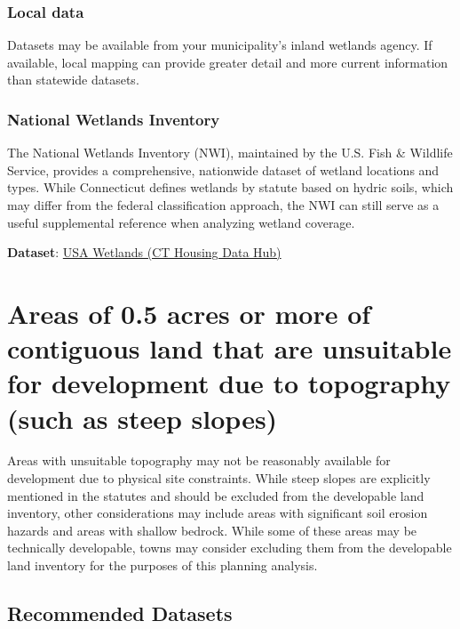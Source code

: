 \documentclass[
  letterpaper,
  DIV=11,
  numbers=noendperiod]{scrreprt}
\begin{document}
\subsubsection{Local data}\label{sec-local-data3}

Datasets may be available from your municipality's inland wetlands
agency. If available, local mapping can provide greater detail and more
current information than statewide datasets.

\subsubsection{National Wetlands Inventory}\label{sec-nwi}

The National Wetlands Inventory (NWI), maintained by the U.S. Fish \&
Wildlife Service, provides a comprehensive, nationwide dataset of
wetland locations and types. While Connecticut defines wetlands by
statute based on hydric soils, which may differ from the federal
classification approach, the NWI can still serve as a useful
supplemental reference when analyzing wetland coverage.

\textbf{Dataset}:
\href{https://housingmaps.ct.gov/maps/9afd2367671f43eaa4cf3972edd32350/about}{USA
Wetlands (CT Housing Data Hub)}

\section{Areas of 0.5 acres or more of contiguous land that are
unsuitable for development due to topography (such as steep
slopes)}\label{areas-of-0.5-acres-or-more-of-contiguous-land-that-are-unsuitable-for-development-due-to-topography-such-as-steep-slopes}

Areas with unsuitable topography may not be reasonably available for
development due to physical site constraints. While steep slopes are
explicitly mentioned in the statutes and should be excluded from the
developable land inventory, other considerations may include areas with
significant soil erosion hazards and areas with shallow bedrock. While
some of these areas may be technically developable, towns may consider
excluding them from the developable land inventory for the purposes of
this planning analysis.

\subsection{Recommended Datasets}\label{recommended-datasets-3}
\end{document}
